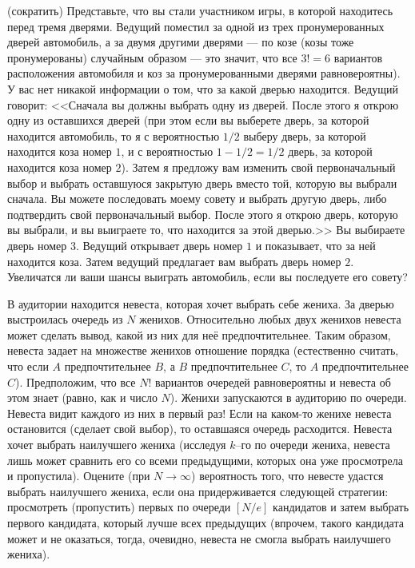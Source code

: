 \begin{problem}(сократить)
Представьте, что вы стали участником игры, в которой находитесь перед тремя дверями. Ведущий поместил за одной из трех 
пронумерованных дверей автомобиль, а за двумя другими дверями --- по козе (козы тоже пронумерованы) случайным образом --– это значит, 
что все $3! = 6$ вариантов расположения автомобиля и коз за пронумерованными дверями равновероятны). У вас нет никакой информации 
о том, что за какой дверью находится. Ведущий говорит: <<Сначала вы должны выбрать одну из дверей. После этого я открою одну из 
оставшихся дверей (при этом если вы выберете дверь, за которой находится автомобиль, то я с вероятностью $1/2$ выберу дверь, 
за которой находится коза номер $1$, и с вероятностью $1-1/2=1/2$ дверь, за которой находится коза номер $2$). Затем я предложу 
вам изменить свой первоначальный выбор и выбрать оставшуюся закрытую дверь вместо той, которую вы выбрали сначала. Вы можете 
последовать моему совету и выбрать другую дверь, либо подтвердить свой первоначальный выбор. После этого я открою дверь, 
которую вы выбрали, и вы выиграете то, что находится за этой дверью.>> Вы выбираете дверь номер $3$. Ведущий открывает дверь номер $1$ 
и показывает, что за ней находится коза. Затем ведущий предлагает вам выбрать дверь номер $2$. Увеличатся ли ваши шансы 
выиграть автомобиль, если вы последуете его совету? 
\end{problem}

 \begin{problem}
 В аудитории находится невеста, которая хочет выбрать себе жениха. За дверью выстроилась очередь из $N$ женихов. Относительно любых 
 двух женихов невеста может сделать вывод, какой из них для неё предпочтительнее. Таким образом, невеста задает на множестве женихов 
 отношение порядка (естественно считать, что если $A$ предпочтительнее $B$, а $B$ предпочтительнее $C$, то $A$ предпочтительнее $C$). 
 Предположим, что все $N!$ вариантов очередей равновероятны и невеста об этом знает (равно, как и число $N$). Женихи запускаются 
 в аудиторию по очереди. Невеста видит каждого из них в первый раз! Если на каком-то женихе невеста остановится (сделает свой выбор), 
 то оставшаяся очередь расходится. Невеста хочет выбрать наилучшего жениха (исследуя $k$–го по очереди жениха, невеста лишь может 
 сравнить его со всеми предыдущими, которых она уже просмотрела и пропустила). Оцените (при $N\to\infty$) вероятность того, что невесте 
 удастся выбрать наилучшего жениха, если она придерживается следующей стратегии: просмотреть (пропустить) первых по очереди $[N/e]$ 
 кандидатов и затем выбрать первого кандидата, который лучше всех предыдущих (впрочем, такого кандидата может и не оказаться, тогда, 
 очевидно, невеста не смогла выбрать наилучшего жениха). 
 \end{problem}
 
